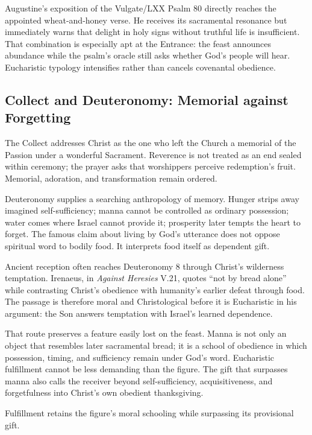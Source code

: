 \begin{deepstudy}
Augustine's exposition of the Vulgate/LXX Psalm 80 directly reaches the appointed wheat-and-honey verse. He receives its sacramental resonance but immediately warns that delight in holy signs without truthful life is insufficient. That combination is especially apt at the Entrance: the feast announces abundance while the psalm's oracle still asks whether God's people will hear. Eucharistic typology intensifies rather than cancels covenantal obedience.

\subsection*{Collect and Deuteronomy: Memorial against Forgetting\enspace{}}

The Collect addresses Christ as the one who left the Church a memorial of the Passion under a wonderful Sacrament. Reverence is not treated as an end sealed within ceremony; the prayer asks that worshippers perceive redemption's fruit. Memorial, adoration, and transformation remain ordered.

Deuteronomy supplies a searching anthropology of memory. Hunger strips away imagined self-sufficiency; manna cannot be controlled as ordinary possession; water comes where Israel cannot provide it; prosperity later tempts the heart to forget. The famous claim about living by God's utterance does not oppose spiritual word to bodily food. It interprets food itself as dependent gift.

Ancient reception often reaches Deuteronomy 8 through Christ's wilderness temptation. Irenaeus, in \emph{Against Heresies} V.21, quotes “not by bread alone” while contrasting Christ's obedience with humanity's earlier defeat through food. The passage is therefore moral and Christological before it is Eucharistic in his argument: the Son answers temptation with Israel's learned dependence.

That route preserves a feature easily lost on the feast. Manna is not only an object that resembles later sacramental bread; it is a school of obedience in which possession, timing, and sufficiency remain under God's word. Eucharistic fulfillment cannot be less demanding than the figure. The gift that surpasses manna also calls the receiver beyond self-sufficiency, acquisitiveness, and forgetfulness into Christ's own obedient thanksgiving.

Fulfillment retains the figure's moral schooling while surpassing its provisional gift.


\end{deepstudy}
